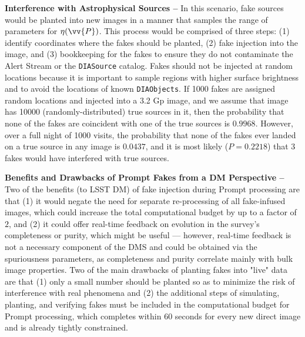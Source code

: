 \documentclass[DM,lsstdraft,toc]{lsstdoc}
\begin{document}
{\bf Interference with Astrophysical Sources -- } In this scenario, fake sources would be planted into new images in a manner that samples the range of parameters for $\eta(\vv{P})$. This process would be comprised of three steps: (1) identify coordinates where the fakes should be planted, (2) fake injection into the image, and (3) bookkeeping for the fakes to ensure they do not contaminate the Alert Stream or the {\tt DIASource} catalog. Fakes should not be injected at random locations because it is important to sample regions with higher surface brightness and to avoid the locations of known {\tt DIAObjects}. If 1000 fakes are  assigned random locations and injected into a 3.2 Gp image, and we assume that image has 10000 (randomly-distributed) true sources in it, then the probability that none of the fakes are coincident with one of the true sources is $0.9968$. However, over a full night of 1000 visits, the probability that none of the fakes ever landed on a true source in any image is $0.0437$, and it is most likely ($P=0.2218$) that 3 fakes would have interfered with true sources. 

{\bf Benefits and Drawbacks of Prompt Fakes from a DM Perspective -- } Two of the benefits (to LSST DM) of fake injection during Prompt processing are that (1) it would negate the need for separate re-processing of all fake-infused images, which could increase the total computational budget by up to a factor of $2$, and (2) it could offer real-time feedback on evolution in the survey's completeness or purity, which might be useful --- however, real-time feedback is not a necessary component of the DMS and could be obtained via the spuriousness parameters, as completeness and purity correlate mainly with bulk image properties. Two of the main drawbacks of planting fakes into "live" data are that (1) only a small number should be planted so as to minimize the risk of interference with real phenomena and (2) the additional steps of simulating, planting, and verifying fakes must be included in the computational budget for Prompt processing, which completes within $60$ seconds for every new direct image and is already tightly constrained. 
\end{document}
